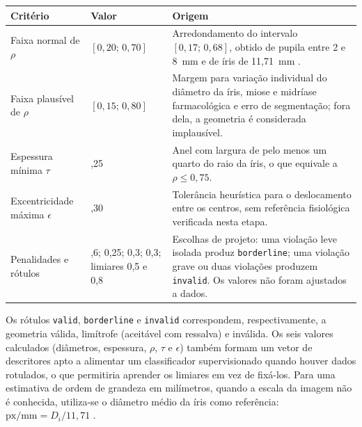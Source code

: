 \documentclass[12pt, oneside, a4paper, chapter=TITLE, section=TITLE,
               english, brazil]{abntex2}
\begin{document}
\begin{quadro}[htbp]
  \caption{Faixas do validador geométrico e sua origem}
  \label{qua:faixas}
  \footnotesize
  \renewcommand{\arraystretch}{1.15}
  \begin{tabular}{|>{\raggedright\arraybackslash}p{3.2cm}
                  |>{\raggedright\arraybackslash}p{2.4cm}
                  |>{\raggedright\arraybackslash}p{8.3cm}|}
    \hline
    \textbf{Critério} & \textbf{Valor} & \textbf{Origem} \\ \hline
    Faixa normal de $\rho$ & $[0{,}20;\, 0{,}70]$ & Arredondamento do
      intervalo $[0{,}17;\, 0{,}68]$, obtido de pupila entre 2 e 8~mm
      \citep*{WatsonYellott2012} e de íris de 11,71~mm \citep*{Rufer2005}. \\ \hline
    Faixa plausível de $\rho$ & $[0{,}15;\, 0{,}80]$ & Margem para variação
      individual do diâmetro da íris, miose e midríase farmacológica e erro
      de segmentação; fora dela, a geometria é considerada implausível. \\ \hline
    Espessura mínima $\tau$ & 0,25 & Anel com largura de pelo menos um
      quarto do raio da íris, o que equivale a $\rho \le 0{,}75$. \\ \hline
    Excentricidade máxima $\epsilon$ & 0,30 & Tolerância heurística para o
      deslocamento entre os centros, sem referência fisiológica verificada
      nesta etapa. \\ \hline
    Penalidades e rótulos & 0,6; 0,25; 0,3; 0,3; limiares 0,5 e 0,8 &
      Escolhas de projeto: uma violação leve isolada produz
      \texttt{borderline}; uma violação grave ou duas violações produzem
      \texttt{invalid}. Os valores não foram ajustados a dados. \\ \hline
  \end{tabular}
\end{quadro}

Os rótulos \texttt{valid}, \texttt{borderline} e \texttt{invalid}
correspondem, respectivamente, a geometria válida, limítrofe (aceitável com
ressalva) e inválida. Os seis valores calculados (diâmetros, espessura, $\rho$,
$\tau$ e $\epsilon$) também formam um vetor de descritores apto a alimentar um
classificador supervisionado quando houver dados rotulados, o que permitiria
aprender os limiares em vez de fixá-los. Para uma estimativa de ordem de
grandeza em milímetros, quando a escala da imagem não é conhecida, utiliza-se o
diâmetro médio da íris como referência: $\text{px/mm} = D_i/11{,}71$
\citep*{Rufer2005}.
\end{document}
